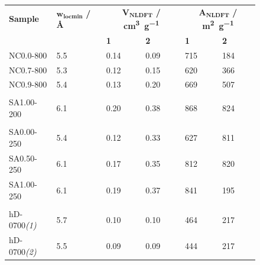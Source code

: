 \begin{figure}[hptb]
    \begin{tabularx}{\textwidth}{llXXXX}
    \toprule
        \textbf{Sample} & $\mathbf{w_{locmin}}$ \textbf{/ \unit[detect-weight]{\angstrom}} & \multicolumn{2}{c}{$\mathbf{V_{NLDFT}}$ \textbf{/ \unit[detect-weight]{\cm\cubed\per\gram}}} & \multicolumn{2}{c}{$\mathbf{A_{NLDFT}}$ \textbf{/ \unit[detect-weight]{\metre\squared\per\gram}}} \\
        & & \textbf{1} & \textbf{2} & \textbf{1} & \textbf{2} \\
    \midrule
        NC0.0-800 & 5.5 & 0.14 & 0.09 & 715 & 184 \\
        NC0.7-800 & 5.3 & 0.12 & 0.15 & 620 & 366 \\
        NC0.9-800 & 5.4 & 0.13 & 0.20 & 669 & 507 \\
        \\
        SA1.00-200 & 6.1 & 0.20 & 0.38 & 868 & 824 \\
        \\
        SA0.00-250 & 5.4 & 0.12 & 0.33 & 627 & 811 \\
        SA0.50-250 & 6.1 & 0.17 & 0.35 & 812 & 820 \\
        SA1.00-250 & 6.1 & 0.19 & 0.37 & 841 & 195 \\
        \\
        hD-0700\textit{(1)} & 5.7 & 0.10 & 0.10 & 464 & 217 \\
        hD-0700\textit{(2)} & 5.5 & 0.09 & 0.09 & 444 & 217 \\
    \bottomrule
    \end{tabularx}
    \label{tb:finepore}
\end{figure}

